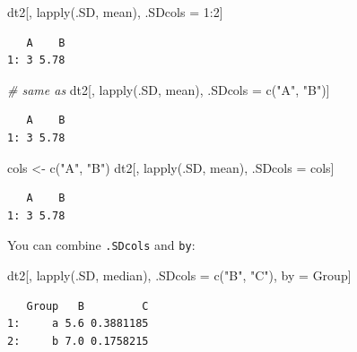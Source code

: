 \documentclass[
]{book}
\newenvironment{Shaded}{\begin{snugshade}}{\end{snugshade}}
\newcommand{\CommentTok}[1]{\textcolor[rgb]{0.56,0.35,0.01}{\textit{#1}}}
\newcommand{\DecValTok}[1]{\textcolor[rgb]{0.00,0.00,0.81}{#1}}
\newcommand{\FunctionTok}[1]{\textcolor[rgb]{0.00,0.00,0.00}{#1}}
\newcommand{\NormalTok}[1]{#1}
\newcommand{\OtherTok}[1]{\textcolor[rgb]{0.56,0.35,0.01}{#1}}
\newcommand{\SpecialCharTok}[1]{\textcolor[rgb]{0.00,0.00,0.00}{#1}}
\newcommand{\StringTok}[1]{\textcolor[rgb]{0.31,0.60,0.02}{#1}}
\begin{document}
\begin{Shaded}
\begin{Highlighting}[]
\NormalTok{dt2[, }\FunctionTok{lapply}\NormalTok{(.SD, mean), .SDcols }\OtherTok{=} \DecValTok{1}\SpecialCharTok{:}\DecValTok{2}\NormalTok{]}
\end{Highlighting}
\end{Shaded}

\begin{verbatim}
   A    B
1: 3 5.78
\end{verbatim}

\begin{Shaded}
\begin{Highlighting}[]
\CommentTok{\# same as}
\NormalTok{dt2[, }\FunctionTok{lapply}\NormalTok{(.SD, mean), .SDcols }\OtherTok{=} \FunctionTok{c}\NormalTok{(}\StringTok{"A"}\NormalTok{, }\StringTok{"B"}\NormalTok{)]}
\end{Highlighting}
\end{Shaded}

\begin{verbatim}
   A    B
1: 3 5.78
\end{verbatim}

\begin{Shaded}
\begin{Highlighting}[]
\NormalTok{cols }\OtherTok{\textless{}{-}} \FunctionTok{c}\NormalTok{(}\StringTok{"A"}\NormalTok{, }\StringTok{"B"}\NormalTok{)}
\NormalTok{dt2[, }\FunctionTok{lapply}\NormalTok{(.SD, mean), .SDcols }\OtherTok{=}\NormalTok{ cols]}
\end{Highlighting}
\end{Shaded}

\begin{verbatim}
   A    B
1: 3 5.78
\end{verbatim}

You can combine \texttt{.SDcols} and \texttt{by}:

\begin{Shaded}
\begin{Highlighting}[]
\NormalTok{dt2[, }\FunctionTok{lapply}\NormalTok{(.SD, median), .SDcols }\OtherTok{=} \FunctionTok{c}\NormalTok{(}\StringTok{"B"}\NormalTok{, }\StringTok{"C"}\NormalTok{), by }\OtherTok{=}\NormalTok{ Group]}
\end{Highlighting}
\end{Shaded}

\begin{verbatim}
   Group   B         C
1:     a 5.6 0.3881185
2:     b 7.0 0.1758215
\end{verbatim}
\end{document}
